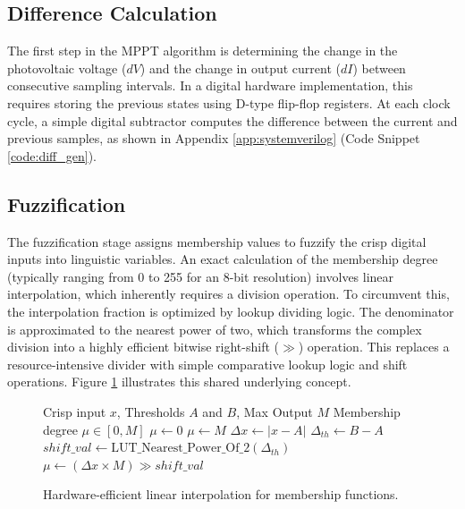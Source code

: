 \documentclass[a4paper,oneside,12pt]{report}
\numberwithin{equation}{chapter}
\begin{document}
\subsection{Difference Calculation}
The first step in the MPPT algorithm is determining the change in the photovoltaic voltage ($dV$) and the change in output current ($dI$) between consecutive sampling intervals. In a digital hardware implementation, this requires storing the previous states using D-type flip-flop registers. At each clock cycle, a simple digital subtractor computes the difference between the current and previous samples, as shown in Appendix \ref{app:systemverilog} (Code Snippet \ref{code:diff_gen}).

\subsection{Fuzzification}
The fuzzification stage assigns membership values to fuzzify the crisp digital inputs into linguistic variables. An exact calculation of the membership degree (typically ranging from 0 to 255 for an 8-bit resolution) involves linear interpolation, which inherently requires a division operation. To circumvent this, the interpolation fraction is optimized by lookup dividing logic. The denominator is approximated to the nearest power of two, which transforms the complex division into a highly efficient bitwise right-shift ($\gg$) operation. This replaces a resource-intensive divider with simple comparative lookup logic and shift operations. Figure \ref{alg:mf_interpolation} illustrates this shared underlying concept.

\begin{figure}[H]
    \begin{algorithmic}[1]
\REQUIRE Crisp input $x$, Thresholds $A$ and $B$, Max Output $M$
\ENSURE Membership degree $\mu \in [0, M]$
    \STATE $\mu \leftarrow 0$ 
    \STATE $\mu \leftarrow M$ 
\ELSE
    \STATE $\Delta x \leftarrow |x - A|$
    \STATE $\Delta_{th} \leftarrow B - A$
    \STATE $shift\_val \leftarrow \text{LUT\_Nearest\_Power\_Of\_2}(\Delta_{th})$
    \STATE $\mu \leftarrow (\Delta x \times M) \gg shift\_val$
\ENDIF
\end{algorithmic}
    \vspace{\baselineskip}
    \caption{Hardware-efficient linear interpolation for membership functions.}\label{alg:mf_interpolation}
\end{figure}
\end{document}
